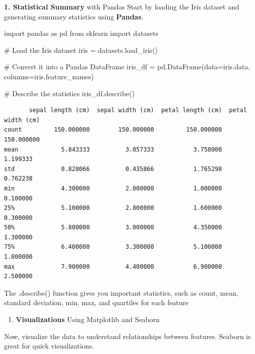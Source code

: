 \documentclass[
  letterpaper,
  DIV=11,
  numbers=noendperiod]{scrreprt}
\newenvironment{Shaded}{\begin{snugshade}}{\end{snugshade}}
\newcommand{\CommentTok}[1]{\textcolor[rgb]{0.37,0.37,0.37}{#1}}
\newcommand{\ImportTok}[1]{\textcolor[rgb]{0.00,0.46,0.62}{#1}}
\newcommand{\NormalTok}[1]{\textcolor[rgb]{0.00,0.23,0.31}{#1}}
\newcommand{\OperatorTok}[1]{\textcolor[rgb]{0.37,0.37,0.37}{#1}}
\providecommand{\tightlist}{%
  \setlength{\itemsep}{0pt}\setlength{\parskip}{0pt}}\usepackage{longtable,booktabs,array}
\begin{document}
\textbf{1. Statistical Summary} with Pandas Start by loading the Iris
dataset and generating summary statistics using \textbf{Pandas}.

\begin{Shaded}
\begin{Highlighting}[]
\ImportTok{import}\NormalTok{ pandas }\ImportTok{as}\NormalTok{ pd}
\ImportTok{from}\NormalTok{ sklearn }\ImportTok{import}\NormalTok{ datasets}

\CommentTok{\# Load the Iris dataset}
\NormalTok{iris }\OperatorTok{=}\NormalTok{ datasets.load\_iris()}

\CommentTok{\# Convert it into a Pandas DataFrame}
\NormalTok{iris\_df }\OperatorTok{=}\NormalTok{ pd.DataFrame(data}\OperatorTok{=}\NormalTok{iris.data, columns}\OperatorTok{=}\NormalTok{iris.feature\_names)}

\CommentTok{\# Describe the statistics}
\NormalTok{iris\_df.describe()}
\end{Highlighting}
\end{Shaded}

\begin{verbatim}
       sepal length (cm)  sepal width (cm)  petal length (cm)  petal width (cm)
count         150.000000        150.000000         150.000000        150.000000
mean            5.843333          3.057333           3.758000          1.199333
std             0.828066          0.435866           1.765298          0.762238
min             4.300000          2.000000           1.000000          0.100000
25%             5.100000          2.800000           1.600000          0.300000
50%             5.800000          3.000000           4.350000          1.300000
75%             6.400000          3.300000           5.100000          1.800000
max             7.900000          4.400000           6.900000          2.500000
\end{verbatim}

The .describe() function gives you important statistics, such as count,
mean, standard deviation, min, max, and quartiles for each feature

\begin{enumerate}
\def\labelenumi{\arabic{enumi}.}
\setcounter{enumi}{1}
\tightlist
\item
  \textbf{Visualizations} Using Matplotlib and Seaborn
\end{enumerate}

Now, visualize the data to understand relationships between features.
Seaborn is great for quick visualizations.
\end{document}
